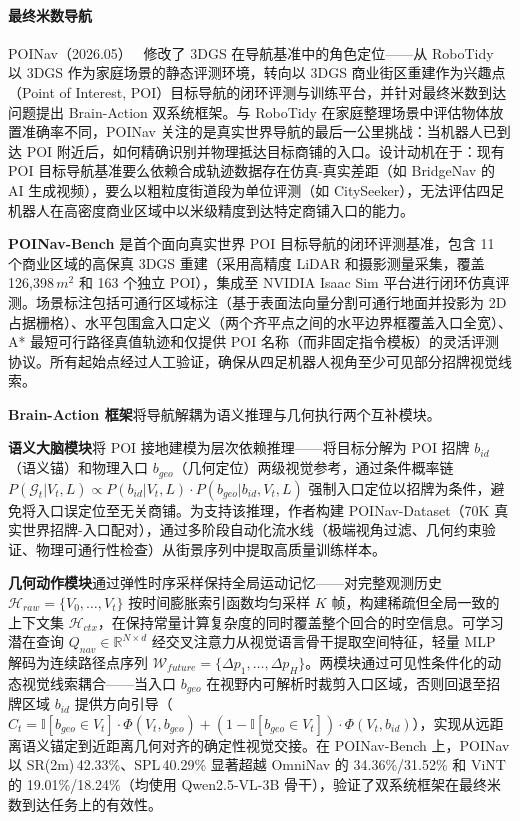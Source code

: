 \paragraph{最终米数导航}

POINav（2026.05）~\cite{2605_28237} 修改了 3DGS 在导航基准中的角色定位——从 RoboTidy 以 3DGS 作为家庭场景的静态评测环境，转向以 3DGS 商业街区重建作为兴趣点（Point of Interest, POI）目标导航的闭环评测与训练平台，并针对最终米数到达问题提出 Brain-Action 双系统框架。与 RoboTidy 在家庭整理场景中评估物体放置准确率不同，POINav 关注的是真实世界导航的最后一公里挑战：当机器人已到达 POI 附近后，如何精确识别并物理抵达目标商铺的入口。设计动机在于：现有 POI 目标导航基准要么依赖合成轨迹数据存在仿真-真实差距（如 BridgeNav 的 AI 生成视频），要么以粗粒度街道段为单位评测（如 CitySeeker），无法评估四足机器人在高密度商业区域中以米级精度到达特定商铺入口的能力。

\textbf{POINav-Bench} 是首个面向真实世界 POI 目标导航的闭环评测基准，包含 11 个商业区域的高保真 3DGS 重建（采用高精度 LiDAR 和摄影测量采集，覆盖 126,398\,$m^2$ 和 163 个独立 POI），集成至 NVIDIA Isaac Sim 平台进行闭环仿真评测。场景标注包括可通行区域标注（基于表面法向量分割可通行地面并投影为 2D 占据栅格）、水平包围盒入口定义（两个齐平点之间的水平边界框覆盖入口全宽）、A* 最短可行路径真值轨迹和仅提供 POI 名称（而非固定指令模板）的灵活评测协议。所有起始点经过人工验证，确保从四足机器人视角至少可见部分招牌视觉线索。

\textbf{Brain-Action 框架}将导航解耦为语义推理与几何执行两个互补模块。

\textbf{语义大脑模块}将 POI 接地建模为层次依赖推理——将目标分解为 POI 招牌 $b_{id}$（语义锚）和物理入口 $b_{geo}$（几何定位）两级视觉参考，通过条件概率链 $P(\mathcal{G}_t|V_t,L) \propto P(b_{id}|V_t,L) \cdot P(b_{geo}|b_{id},V_t,L)$ 强制入口定位以招牌为条件，避免将入口误定位至无关商铺。为支持该推理，作者构建 POINav-Dataset（70K 真实世界招牌-入口配对），通过多阶段自动化流水线（极端视角过滤、几何约束验证、物理可通行性检查）从街景序列中提取高质量训练样本。

\textbf{几何动作模块}通过弹性时序采样保持全局运动记忆——对完整观测历史 $\mathcal{H}_{raw}=\{V_0,\ldots,V_t\}$ 按时间膨胀索引函数均匀采样 $K$ 帧，构建稀疏但全局一致的上下文集 $\mathcal{H}_{ctx}$，在保持常量计算复杂度的同时覆盖整个回合的时空信息。可学习潜在查询 $Q_{nav} \in \mathbb{R}^{N \times d}$ 经交叉注意力从视觉语言骨干提取空间特征，轻量 MLP 解码为连续路径点序列 $\mathcal{W}_{future}=\{\Delta p_1,\ldots,\Delta p_H\}$。两模块通过可见性条件化的动态视觉线索耦合——当入口 $b_{geo}$ 在视野内可解析时裁剪入口区域，否则回退至招牌区域 $b_{id}$ 提供方向引导（$C_t = \mathbb{I}[b_{geo} \in V_t] \cdot \Phi(V_t,b_{geo}) + (1-\mathbb{I}[b_{geo} \in V_t]) \cdot \Phi(V_t,b_{id})$），实现从远距离语义锚定到近距离几何对齐的确定性视觉交接。在 POINav-Bench 上，POINav 以 SR(2m)\,42.33\%、SPL\,40.29\% 显著超越 OmniNav 的 34.36\%/31.52\% 和 ViNT 的 19.01\%/18.24\%（均使用 Qwen2.5-VL-3B 骨干），验证了双系统框架在最终米数到达任务上的有效性。

